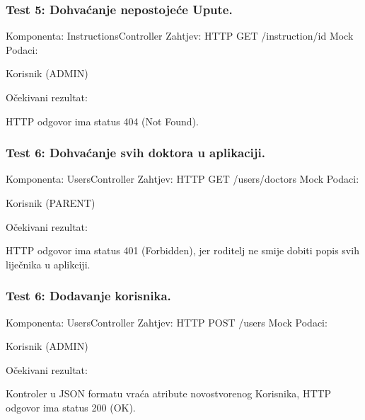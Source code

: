 			\subsubsection*{Test 5: Dohvaćanje nepostojeće Upute.}
			Komponenta: InstructionsController \newline
			Zahtjev: HTTP GET /instruction/{id} \newline
			Mock Podaci:
			\begin{packed_item}
				\item Korisnik (ADMIN)
			\end{packed_item}
			Očekivani rezultat:
			\begin{packed_item}
				\item HTTP odgovor ima status 404 (Not Found).
			\end{packed_item}

			\subsubsection*{Test 6: Dohvaćanje svih doktora u aplikaciji.}
			Komponenta: UsersController \newline
			Zahtjev: HTTP GET /users/doctors \newline
			Mock Podaci:
			\begin{packed_item}
				\item Korisnik (PARENT)
			\end{packed_item}
			Očekivani rezultat:
			\begin{packed_item}
				\item HTTP odgovor ima status 401 (Forbidden), jer roditelj ne smije dobiti popis svih liječnika u aplikciji.
			\end{packed_item}
			
			\subsubsection*{Test 6: Dodavanje korisnika.}
			Komponenta: UsersController \newline
			Zahtjev: HTTP POST /users \newline
			Mock Podaci:
			\begin{packed_item}
				\item Korisnik (ADMIN)
			\end{packed_item}
			Očekivani rezultat:
			\begin{packed_item}
				\item Kontroler u JSON formatu vraća atribute novostvorenog Korisnika, HTTP odgovor ima status 200 (OK).
			\end{packed_item}
			
